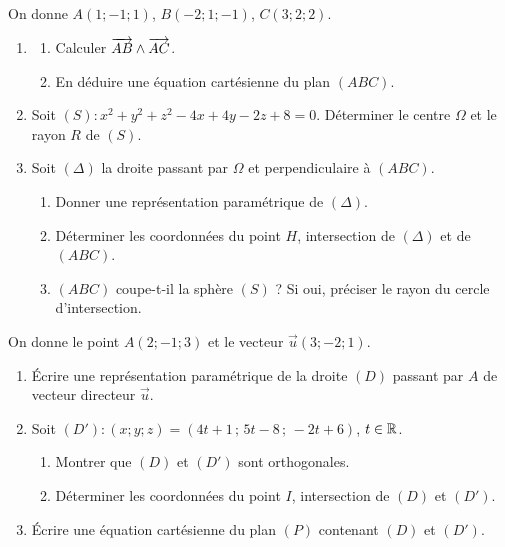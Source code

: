 On donne $A(1;-1;1)$, $B(-2;1;-1)$, $C(3;2;2)$.
\begin{enumerate}
	\item
	\begin{enumerate}
		\item Calculer $\overrightarrow{AB} \wedge \overrightarrow{AC}$.
		\item En déduire une équation cartésienne du plan $(ABC)$.
	\end{enumerate}
	\item Soit $(S) : x^2 + y^2 + z^2 - 4x + 4y - 2z + 8 = 0$. Déterminer le
	centre $\Omega$ et le rayon $R$ de $(S)$.
	\item Soit $(\Delta)$ la droite passant par $\Omega$ et perpendiculaire à
	$(ABC)$.
	\begin{enumerate}
		\item Donner une représentation paramétrique de $(\Delta)$.
		\item Déterminer les coordonnées du point $H$, intersection de
		$(\Delta)$ et de $(ABC)$.
		\item $(ABC)$ coupe-t-il la sphère $(S)$ ? Si oui, préciser le rayon du
		cercle d'intersection.
	\end{enumerate}
\end{enumerate}

On donne le point $A(2;-1;3)$ et le vecteur $\vec u(3;-2;1)$.
\begin{enumerate}
	\item Écrire une représentation paramétrique de la droite $(D)$ passant par
	$A$ de vecteur directeur $\vec u$.
	\item Soit $(D') : (x;y;z) = (4t + 1\,;\,5t - 8\,;\,-2t + 6)$, $t \in \mathbb{R}$.
	\begin{enumerate}
		\item Montrer que $(D)$ et $(D')$ sont orthogonales.
		\item Déterminer les coordonnées du point $I$, intersection de $(D)$ et
		$(D')$.
	\end{enumerate}
	\item Écrire une équation cartésienne du plan $(P)$ contenant $(D)$ et
	$(D')$.
\end{enumerate}
